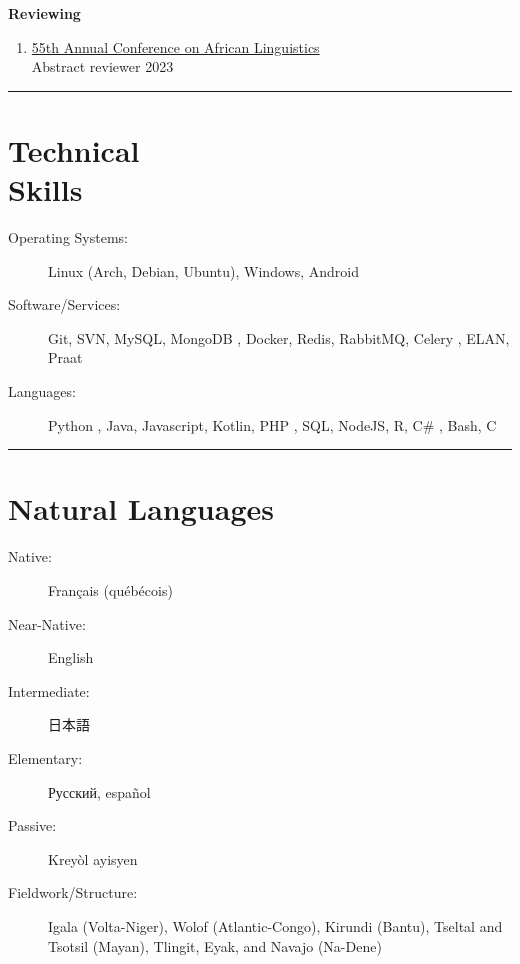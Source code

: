 \documentclass[margin,line]{resume}
\begin{document}
\begin{resume}
	\textbf{Reviewing}
	\begin{enumerate}[-, leftmargin=1em, topsep=4pt]
		\item[]  \href{https://acal55.mull-lab.org/}{55th Annual Conference on African Linguistics}\\
		      \hphantom{...}Abstract reviewer \hfill 2023
	\end{enumerate}

	\vspace{-1em}\rule{\textwidth}{0.4pt}


	\section{\mysidestyle Technical\\Skills}\vspace{2mm}
	\begin{description}
		\item[Operating Systems:] Linux (Arch, Debian, Ubuntu), Windows, Android
		\item[Software/Services:] Git, SVN, MySQL, MongoDB%
		      , Docker, Redis, RabbitMQ, Celery%
		      , ELAN, Praat%
		\item[Languages:] Python%
		      , Java, Javascript, Kotlin, PHP%
		      , SQL, NodeJS, R, C\#%
		      , Bash, C%
	\end{description}

	\vspace{-1.1em}\rule{\textwidth}{0.4pt}


	\section{\mysidestyle Natural Languages}\vspace{2mm}
	\begin{description}
		\item[Native:] Français (québécois)
		\item[Near-Native:] English
		\item[Intermediate:] \begin{CJK}{UTF8}{min}日本語\end{CJK}
		\item[Elementary:] Русский, español
		\item[Passive:] Kreyòl ayisyen
		\item[Fieldwork/Structure:] Igala (Volta-Niger), Wolof (Atlantic-Congo), Kirundi (Bantu),
		      Tseltal and Tsotsil (Mayan), Tlingit, Eyak, and Navajo (Na-Dene)%
	\end{description}

	\BgThispage

\end{resume}
\end{document}
